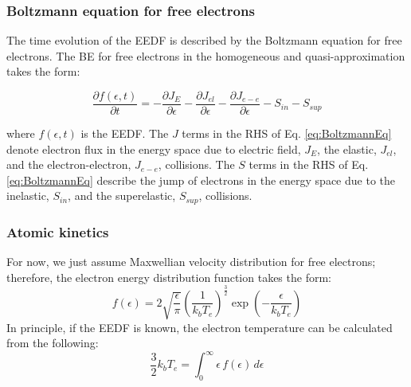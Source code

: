 \subsubsection{Boltzmann equation for free electrons} \label{sec:EEDF}
The time evolution of the EEDF is described by the Boltzmann equation for free electrons. The BE for free electrons in the homogeneous and quasi-approximation takes the form: 

\begin{equation}
    \label{eq:BoltzmannEq}
    \frac{\partial f(\epsilon,t)}{\partial t} =  - \frac{\partial J_E}{\partial \epsilon} - \frac{\partial J_{el}}{\partial \epsilon} -\frac{\partial J_{e-e}}{\partial \epsilon} - S_{in} - S_{sup}
\end{equation}

\noindent where $ f(\epsilon,t)$ is the EEDF. The $J$ terms in the RHS of Eq.  \eqref{eq:BoltzmannEq} denote electron flux in the energy space due to electric field, $J_E$, the elastic, $J_{el}$, and the electron-electron, $J_{e-e}$, collisions. The $S$ terms in the RHS of Eq.  \eqref{eq:BoltzmannEq} describe the jump of electrons in the energy space due to the inelastic, $S_{in}$, and the superelastic, $S_{sup}$, collisions.  



\subsubsection{Atomic kinetics} \label{sec:AtomicKinetics}

For now, we just assume Maxwellian velocity distribution for free electrons; therefore,  the electron energy distribution function takes the form: 
% 
\begin{equation}
    \label{eq:EEDF_Maxwellian}
    f(\epsilon) = 2 \sqrt{\frac{\epsilon}{\pi}} \left( \frac{1}{k_b T_e} \right)^{\frac{3}{2}} \exp(-\frac{\epsilon}{k_b T_e})
\end{equation}
% 
In principle, if the EEDF is known, the electron temperature can be calculated from the following:
% 
\begin{equation}
    \label{eq:Definition_of_Te}
    \frac{3}{2} k_b T_e = \int_{0}^\infty \epsilon \, f(\epsilon) \, d\epsilon
\end{equation}
% 

